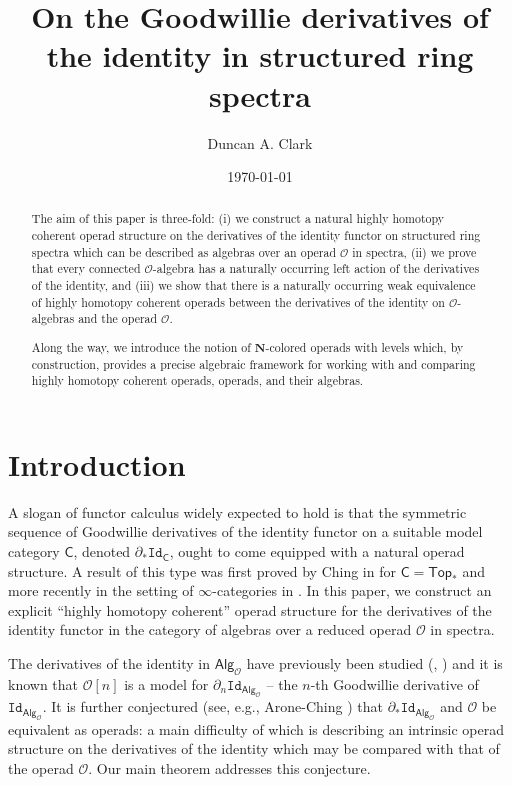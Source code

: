 \documentclass[11pt]{amsart}
\title[Derivatives of the identity]{On the Goodwillie derivatives of the identity in structured ring spectra}
\author{Duncan A. Clark}
\theoremstyle{definition}
\theoremstyle{remark}
\newcommand{\Alg}[1]{ {\mathsf{Alg}_{\mathcal{#1}}} }
\newcommand{\Id}{\mathtt{Id}}
\newcommand{\Cal}[1]{\mathcal{#1}}
\begin{document}
\date{\today}
\maketitle

\begin{abstract}
    The aim of this paper is three-fold: (i) we construct a natural highly homotopy coherent operad structure on the derivatives of the identity functor on structured ring spectra which can be described as algebras over an operad $\Cal{O}$ in spectra, (ii) we prove that every connected $\Cal{O}$-algebra has a naturally occurring left action of the derivatives of the identity, and (iii) we show that there is a naturally occurring weak equivalence of highly homotopy coherent operads between the derivatives of the identity on $\Cal{O}$-algebras and the operad $\Cal{O}$. 
    
    Along the way, we introduce the notion of $\mathbf{N}$-colored operads with levels which, by construction, provides a precise algebraic framework for working with and comparing highly homotopy coherent operads, operads, and their algebras. 
\end{abstract}


\section{Introduction}


A slogan of functor calculus widely expected to hold is that the symmetric sequence of Goodwillie derivatives of the identity functor on a suitable model category $\mathsf{C}$, denoted $\partial_* \Id_{\mathsf{C}}$, ought to come equipped with a natural operad structure. A result of this type was first proved by Ching in \cite{Ching-thesis} for $\mathsf{C}=\mathsf{Top}_*$ and more recently in the setting of $\infty$-categories in \cite{Ching-day-conv}. In this paper, we construct an explicit ``highly homotopy coherent'' operad structure for the derivatives of the identity functor in the category of algebras over a reduced operad $\Cal{O}$ in spectra.

The derivatives of the identity in $\Alg{O}$ have previously been studied (\cite{Per-thesis}, \cite{KuhPer}) and it is known that $\Cal{O}[n]$ is a model for $\partial_n \Id_{\Alg{O}}$ -- the $n$-th Goodwillie derivative of $\Id_{\Alg{O}}$. It is further conjectured (see, e.g.,  Arone-Ching \cite{AC-1}) that $\partial_* \Id_{\Alg{O}}$ and $\Cal{O}$ be equivalent as operads: a main difficulty of which is describing an intrinsic operad structure on the derivatives of the identity which may be compared with that of the operad $\Cal{O}$. Our main theorem addresses this conjecture. 
\end{document}
